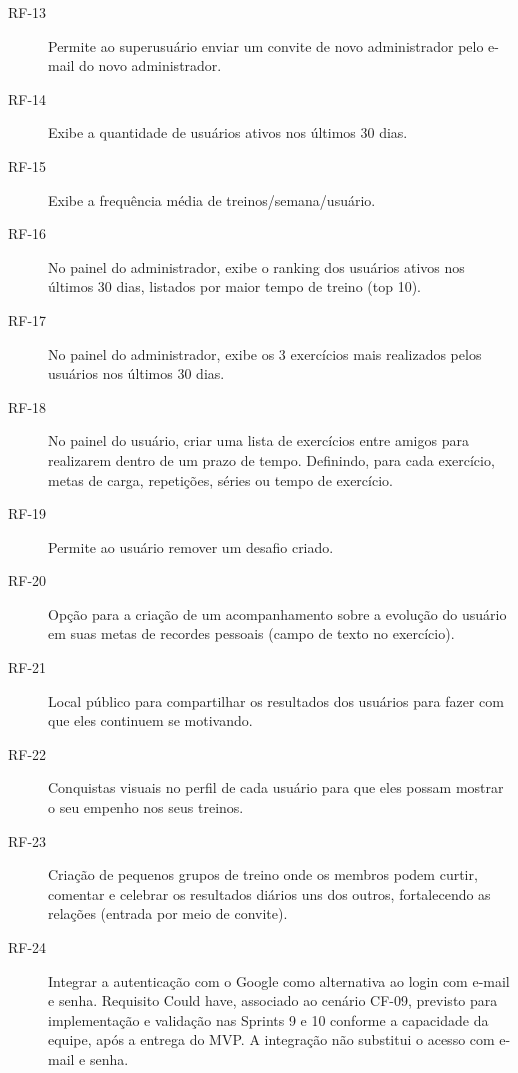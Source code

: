 \begin{description}
\item[RF-13] Permite ao superusuário enviar um convite de novo administrador pelo e-mail do novo administrador.

\item[RF-14] Exibe a quantidade de usuários ativos nos últimos 30 dias.

\item[RF-15] Exibe a frequência média de treinos/semana/usuário.

\item[RF-16] No painel do administrador, exibe o ranking dos usuários ativos nos últimos 30 dias, listados por maior tempo de treino (top 10).

\item[RF-17] No painel do administrador, exibe os 3 exercícios mais realizados pelos usuários nos últimos 30 dias.

\item[RF-18] No painel do usuário, criar uma lista de exercícios entre amigos para realizarem dentro de um prazo de tempo. Definindo, para cada exercício, metas de carga, repetições, séries ou tempo de exercício.

\item[RF-19] Permite ao usuário remover um desafio criado.

\item[RF-20] Opção para a criação de um acompanhamento sobre a evolução do usuário em suas metas de recordes pessoais (campo de texto no exercício).

\item[RF-21] Local público para compartilhar os resultados dos usuários para fazer com que eles continuem se motivando.

\item[RF-22] Conquistas visuais no perfil de cada usuário para que eles possam mostrar o seu empenho nos seus treinos.

\item[RF-23] Criação de pequenos grupos de treino onde os membros podem curtir, comentar e celebrar os resultados diários uns dos outros, fortalecendo as relações (entrada por meio de convite).

\item[RF-24] Integrar a autenticação com o Google como alternativa ao login com e-mail e senha. Requisito Could have, associado ao cenário CF-09, previsto para implementação e validação nas Sprints 9 e 10 conforme a capacidade da equipe, após a entrega do MVP. A integração não substitui o acesso com e-mail e senha.

\end{description}

